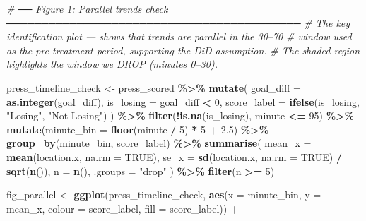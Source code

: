 \documentclass[
]{article}
\newenvironment{Shaded}{\begin{snugshade}}{\end{snugshade}}
\newcommand{\AttributeTok}[1]{\textcolor[rgb]{0.13,0.29,0.53}{#1}}
\newcommand{\CommentTok}[1]{\textcolor[rgb]{0.56,0.35,0.01}{\textit{#1}}}
\newcommand{\ConstantTok}[1]{\textcolor[rgb]{0.56,0.35,0.01}{#1}}
\newcommand{\DecValTok}[1]{\textcolor[rgb]{0.00,0.00,0.81}{#1}}
\newcommand{\FloatTok}[1]{\textcolor[rgb]{0.00,0.00,0.81}{#1}}
\newcommand{\FunctionTok}[1]{\textcolor[rgb]{0.13,0.29,0.53}{\textbf{#1}}}
\newcommand{\NormalTok}[1]{#1}
\newcommand{\OtherTok}[1]{\textcolor[rgb]{0.56,0.35,0.01}{#1}}
\newcommand{\SpecialCharTok}[1]{\textcolor[rgb]{0.81,0.36,0.00}{\textbf{#1}}}
\newcommand{\StringTok}[1]{\textcolor[rgb]{0.31,0.60,0.02}{#1}}
\begin{document}
\begin{Shaded}
\begin{Highlighting}[]
\CommentTok{\# ── Figure 1: Parallel trends check ──────────────────────────────────────────}
\CommentTok{\# The key identification plot — shows that trends are parallel in the 30–70}
\CommentTok{\# window used as the pre{-}treatment period, supporting the DiD assumption.}
\CommentTok{\# The shaded region highlights the window we DROP (minutes 0–30).}

\NormalTok{press\_timeline\_check }\OtherTok{\textless{}{-}}\NormalTok{ press\_scored }\SpecialCharTok{\%\textgreater{}\%}
  \FunctionTok{mutate}\NormalTok{(}
    \AttributeTok{goal\_diff   =} \FunctionTok{as.integer}\NormalTok{(goal\_diff),}
    \AttributeTok{is\_losing   =}\NormalTok{ goal\_diff }\SpecialCharTok{\textless{}} \DecValTok{0}\NormalTok{,}
    \AttributeTok{score\_label =} \FunctionTok{ifelse}\NormalTok{(is\_losing, }\StringTok{"Losing"}\NormalTok{, }\StringTok{"Not Losing"}\NormalTok{)}
\NormalTok{  ) }\SpecialCharTok{\%\textgreater{}\%}
  \FunctionTok{filter}\NormalTok{(}\SpecialCharTok{!}\FunctionTok{is.na}\NormalTok{(is\_losing), minute }\SpecialCharTok{\textless{}=} \DecValTok{95}\NormalTok{) }\SpecialCharTok{\%\textgreater{}\%}
  \FunctionTok{mutate}\NormalTok{(}\AttributeTok{minute\_bin =} \FunctionTok{floor}\NormalTok{(minute }\SpecialCharTok{/} \DecValTok{5}\NormalTok{) }\SpecialCharTok{*} \DecValTok{5} \SpecialCharTok{+} \FloatTok{2.5}\NormalTok{) }\SpecialCharTok{\%\textgreater{}\%}
  \FunctionTok{group\_by}\NormalTok{(minute\_bin, score\_label) }\SpecialCharTok{\%\textgreater{}\%}
  \FunctionTok{summarise}\NormalTok{(}
    \AttributeTok{mean\_x =} \FunctionTok{mean}\NormalTok{(location.x, }\AttributeTok{na.rm =} \ConstantTok{TRUE}\NormalTok{),}
    \AttributeTok{se\_x   =} \FunctionTok{sd}\NormalTok{(location.x,   }\AttributeTok{na.rm =} \ConstantTok{TRUE}\NormalTok{) }\SpecialCharTok{/} \FunctionTok{sqrt}\NormalTok{(}\FunctionTok{n}\NormalTok{()),}
    \AttributeTok{n      =} \FunctionTok{n}\NormalTok{(),}
    \AttributeTok{.groups =} \StringTok{"drop"}
\NormalTok{  ) }\SpecialCharTok{\%\textgreater{}\%}
  \FunctionTok{filter}\NormalTok{(n }\SpecialCharTok{\textgreater{}=} \DecValTok{5}\NormalTok{)}

\NormalTok{fig\_parallel }\OtherTok{\textless{}{-}} \FunctionTok{ggplot}\NormalTok{(press\_timeline\_check,}
       \FunctionTok{aes}\NormalTok{(}\AttributeTok{x =}\NormalTok{ minute\_bin, }\AttributeTok{y =}\NormalTok{ mean\_x,}
           \AttributeTok{colour =}\NormalTok{ score\_label, }\AttributeTok{fill =}\NormalTok{ score\_label)) }\SpecialCharTok{+}


\end{Highlighting}
\end{Shaded}
\end{document}

